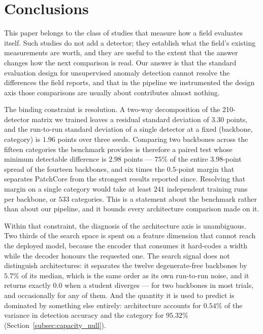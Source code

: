 
\section{Conclusions}
\label{sec:conclusion}

This paper belongs to the class of studies that measure how a field evaluates
itself. Such studies do not add a detector; they establish what the field's
existing measurements are worth, and they are useful to the extent that the
answer changes how the next comparison is read. Our answer is that the standard
evaluation design for unsupervised anomaly detection cannot resolve the
differences the field reports, and that in the pipeline we instrumented the
design axis those comparisons are usually about contributes almost nothing.

The binding constraint is resolution. A two-way decomposition of the 210-detector
matrix we trained leaves a residual standard deviation of $3.30$ points, and the
run-to-run standard deviation of a single detector at a fixed (backbone,
category) is $1.96$ points over three seeds. Comparing two backbones across the
fifteen categories the benchmark provides is therefore a paired test whose minimum
detectable difference is $2.98$ points --- $75\%$ of the entire $3.98$-point
spread of the fourteen backbones, and six times the $0.5$-point margin that
separates PatchCore from the strongest results reported since. Resolving that
margin on a single category would take at least $241$ independent training runs per
backbone, or $533$ categories. This is a statement about the benchmark rather than
about our pipeline, and it bounds every architecture comparison made on it.

Within that constraint, the diagnosis of the architecture axis is unambiguous.
Two thirds of the search space is spent on a feature dimension that cannot reach
the deployed model, because the encoder that consumes it hard-codes a width while
the decoder honours the requested one. The search signal does not distinguish
architectures: it separates the twelve degenerate-free backbones by $5.7\%$ of
its median, which is the same order as its own run-to-run noise, and it returns
exactly $0.0$ when a student diverges --- for two backbones in most trials, and
occasionally for any of them. And the quantity it is used to predict is dominated
by something else entirely: architecture accounts for $0.54\%$ of the variance in
detection accuracy and the category for $95.32\%$
(Section~\ref{subsec:capacity_null}).

